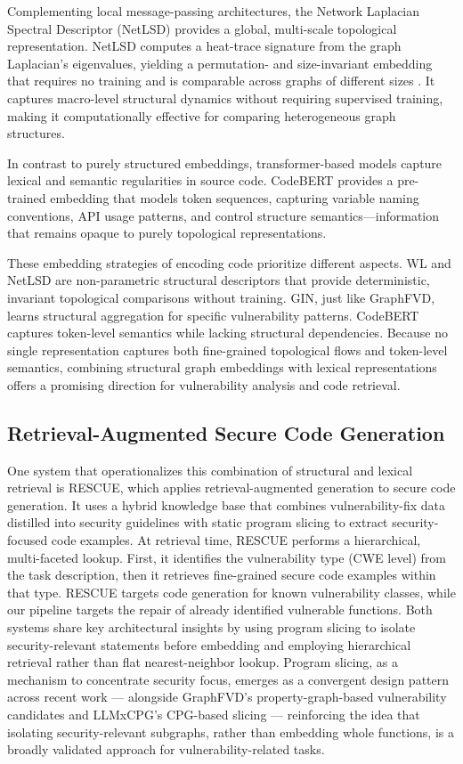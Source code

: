 Complementing local message-passing architectures, the Network Laplacian Spectral Descriptor (NetLSD)\cite{netlsd} provides a global, multi-scale topological representation. 
NetLSD computes a heat-trace signature from the graph Laplacian's eigenvalues, yielding a permutation- and size-invariant embedding that requires no training and is comparable across graphs of different sizes \cite{netlsd}. 
It captures macro-level structural dynamics without requiring supervised training, making it computationally effective for comparing heterogeneous graph structures.

In contrast to purely structured embeddings, transformer-based models capture lexical and semantic regularities in source code. 
CodeBERT \cite{feng2020codebert} provides a pre-trained embedding that models token sequences, capturing variable naming conventions, API usage patterns, and control structure semantics—information that remains opaque to purely topological representations.

These embedding strategies of encoding code prioritize different aspects. 
WL and NetLSD are non-parametric structural descriptors that provide deterministic, invariant topological comparisons without training. 
GIN, just like GraphFVD, learns structural aggregation for specific vulnerability patterns. 
CodeBERT captures token-level semantics while lacking structural dependencies. 
Because no single representation captures both fine-grained topological flows and token-level semantics, combining structural graph embeddings with lexical representations offers a promising direction for vulnerability analysis and code retrieval.

\subsection{Retrieval-Augmented Secure Code Generation}

One system that operationalizes this combination of structural and lexical retrieval is RESCUE, which applies retrieval-augmented generation to secure code generation. 
It uses a hybrid knowledge base that combines vulnerability-fix data distilled into security guidelines with static program slicing to extract security-focused code examples. 
At retrieval time, RESCUE performs a hierarchical, multi-faceted lookup. 
First, it identifies the vulnerability type (CWE level) from the task description, then it retrieves fine-grained secure code examples within that type. 
RESCUE targets code generation for known vulnerability classes, while our pipeline targets the repair of already identified vulnerable functions. 
Both systems share key architectural insights by using program slicing to isolate security-relevant statements before embedding and employing hierarchical retrieval rather than flat nearest-neighbor lookup. 
Program slicing, as a mechanism to concentrate security focus, emerges as a convergent design pattern across recent work — alongside GraphFVD's property-graph-based vulnerability candidates and LLMxCPG's CPG-based slicing — reinforcing the idea that isolating security-relevant subgraphs, rather than embedding whole functions, is a broadly validated approach for vulnerability-related tasks.

